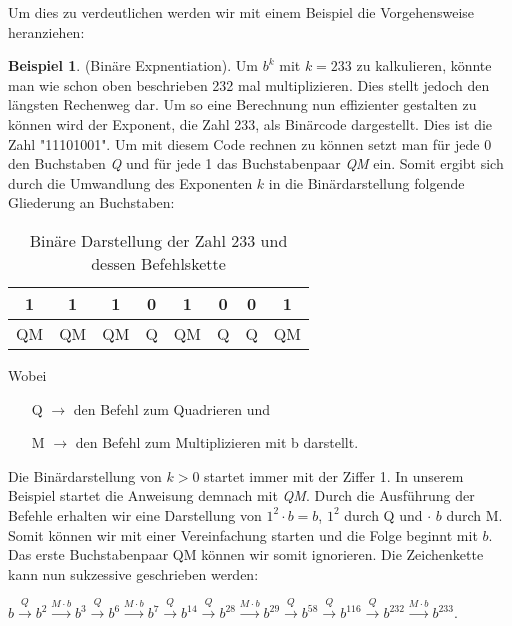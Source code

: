 \documentclass[12pt,a4paper]{article}
\theoremstyle{definition}
\newtheorem{bsp}{Beispiel}[subsection]
\begin{document}
Um dies zu verdeutlichen werden wir mit einem Beispiel die Vorgehensweise heranziehen:
\begin{bsp}(Binäre Expnentiation).\newline
Um $b^k$ mit $k=233$ zu kalkulieren, könnte man wie schon oben beschrieben 232 mal multiplizieren.
Dies stellt jedoch den längsten Rechenweg dar.
Um so eine Berechnung nun effizienter gestalten zu können wird der Exponent, die Zahl 233, als Binärcode dargestellt.
Dies ist die Zahl "11101001".
Um mit diesem Code rechnen zu können setzt man für jede 0 den Buchstaben \textit{Q} und für jede 1 das Buchstabenpaar \textit{QM} ein.
Somit ergibt sich durch die Umwandlung des Exponenten $k$ in die Binärdarstellung folgende Gliederung an Buchstaben:

\begin{table}[h]\centering
\begin{tabular}{c|c|c|c|c|c|c|c}
1 & 1 & 1 & 0 & 1 & 0 & 0 & 1 \\
\hline
QM & QM & QM & Q & QM & Q & Q & QM \\
\end{tabular}
\caption{Binäre Darstellung der Zahl 233 und dessen Befehlskette}
\label{tab:Binäre Darstellung der Zahl 233 und desses Befehlskette}
\end{table}

Wobei
\begin{itemize}
    \item[Q] $\rightarrow$ den Befehl zum Quadrieren und
    \item[M] $\rightarrow$ den Befehl zum Multiplizieren mit b darstellt.
\end{itemize}

Die Binärdarstellung von $k > 0$ startet immer mit der Ziffer 1.
In unserem Beispiel startet die Anweisung demnach mit \textit{QM}.
Durch die Ausführung der Befehle erhalten wir eine Darstellung von ${1^2 \cdot b = b}$, ${1^2}$ durch Q und $\cdot$ $b$ durch M.
Somit können wir mit einer Vereinfachung starten und die Folge beginnt mit $b$.
Das erste Buchstabenpaar QM können wir somit ignorieren.\newline
Die Zeichenkette kann nun sukzessive geschrieben werden:

$b\stackrel{Q}{\longrightarrow}b^2\stackrel{M \cdot b}{\longrightarrow}b^3\stackrel{Q}{\longrightarrow}b^6\stackrel{M \cdot b}{\longrightarrow}b^7\stackrel{Q}{\longrightarrow}b^{14}\stackrel{Q}{\longrightarrow}b^{28}\stackrel{M \cdot b}{\longrightarrow}b^{29}\stackrel{Q}{\longrightarrow}b^{58}\stackrel{Q}{\longrightarrow}b^{116}\stackrel{Q}{\longrightarrow}b^{232}\stackrel{M \cdot b}{\longrightarrow}b^{233}$.


\end{bsp}
\end{document}
